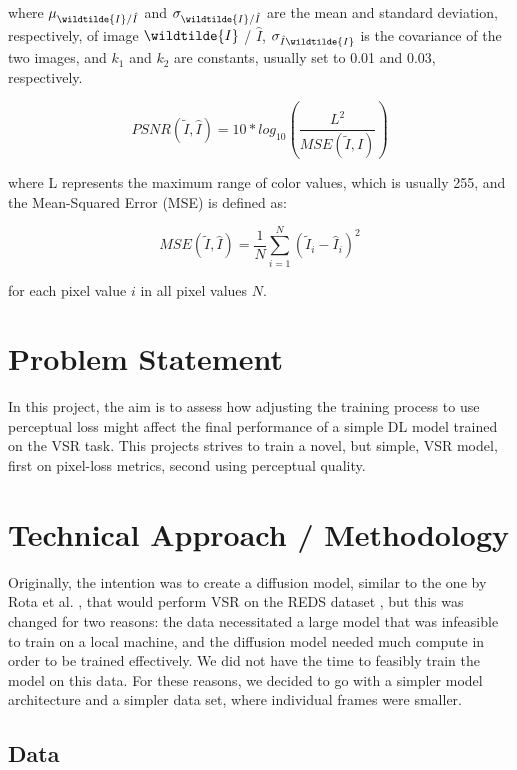 \documentclass{article}
\begin{document}
where \(\mu_{\wildtilde{I} / \hat{I}}\) and \(\sigma_{\wildtilde{I} / \hat{I}}\) are the mean and standard deviation, respectively, of image \(\wildtilde{I}\) / \(\hat{I}\), \(\sigma_{\hat{I} \wildtilde{I}}\) is the covariance of the two images, and \(k_1\) and \(k_2\) are constants, usually set to 0.01 and 0.03, respectively.

\begin{equation}
    PSNR(\widetilde{I}, \hat{I}) = 10*log_{10} \left( \frac{L^2}{MSE ( \widetilde{I}, \hat{I} )} \right)
\end{equation} 

where L represents the maximum range of color values, which is usually 255, and the Mean-Squared Error (MSE) is defined as: 

\begin{equation}
    MSE(\widetilde{I}, \hat{I}) = \frac{1}{N} \sum^{N}_{i=1} (\widetilde{I}_i - \hat{I}_i)^2
\end{equation} 

for each pixel value \(i\) in all pixel values \(N\). 

\section{Problem Statement}

In this project, the aim is to assess how adjusting the training process to use perceptual loss might affect the final performance of a simple DL model trained on the VSR task. This projects strives to train a novel, but simple, VSR model, first on pixel-loss metrics, second using perceptual quality.  

\section{Technical Approach / Methodology}

Originally, the intention was to create a diffusion model, similar to the one by Rota et al. \cite{rota_enhancing_2023}, that would perform VSR on the REDS dataset \cite{nah_ntire_2021}, but this was changed for two reasons: the data necessitated a large model that was infeasible to train on a local machine, and the diffusion model needed much compute in order to be trained effectively. We did not have the time to feasibly train the model on this data. For these reasons, we decided to go with a simpler model architecture and a simpler data set, where individual frames were smaller.

\subsection{Data}
\end{document}
